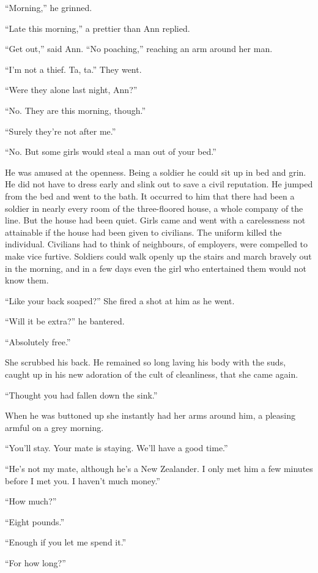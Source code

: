 ``Morning,'' he grinned.

``Late this morning,'' a prettier than Ann replied.

``Get out,'' said Ann. ``No poaching,'' reaching an arm around her man.

``I'm not a thief. Ta, ta.'' They went.

``Were they alone last night, Ann?''

``No. They are this morning, though.''

``Surely they're not after me.''

``No. But some girls would steal a man out of your bed.''

He was amused at the openness. Being a soldier he could sit up in bed and grin. He did not have to dress early and slink out to save a civil reputation. He jumped from the bed and went to the bath. It occurred to him that there had been a soldier in nearly every room of the three-floored house, a whole company of the line. But the house had been quiet. Girls came and went with a carelessness not attainable if the house had been given to civilians. The uniform killed the individual. Civilians had to think of neighbours, of employers, were compelled to make vice furtive. Soldiers could walk openly up the stairs and march bravely out in the morning, and in a few days even the girl who entertained them would not know them.

``Like your back soaped?'' She fired a shot at him as he went.

``Will it be extra?'' he bantered.

``Absolutely free.''

She scrubbed his back. He remained so long laving his body with the suds, caught up in his new adoration of the cult of cleanliness, that she came again.

``Thought you had fallen down the sink.''

When he was buttoned up she instantly had her arms around him, a pleasing armful on a grey morning.

``You'll stay. Your mate is staying. We'll have a good time.''

``He's not my mate, although he's a New Zealander. I only met him a few minutes before I met you. I haven't much money.''

``How much?''

``Eight pounds.''

``Enough if you let me spend it.''

``For how long?''

